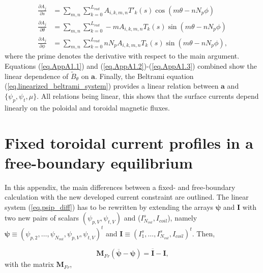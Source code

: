 \begin{align}
	\frac{\partial A_j}{\partial s} &= \sum_{m,n}\sum_{k=0}^{L_{rad}} A_{i,k,m,n}T'_k(s)\cos(m\theta-nN_p\phi) \label{eq.AppA1.2} \\
	\frac{\partial A_j}{\partial \theta} &= \sum_{m,n}\sum_{k=0}^{L_{rad}} -mA_{i,k,m,n}T_k(s)\sin(m\theta-nN_p\phi) \\
	\frac{\partial A_j}{\partial \phi} &= \sum_{m,n}\sum_{k=0}^{L_{rad}} nN_pA_{i,k,m,n}T_k(s)\sin(m\theta-nN_p\phi) , \label{eq.AppA1.3}
\end{align}
where the prime denotes the derivative with respect to the main argument. Equations (\ref{eq.AppA1.1}) and (\ref{eq.AppA1.2})-(\ref{eq.AppA1.3}) combined show the linear dependence of $\tilde{B}_\theta$ on $\mathbf{a}$. Finally, the Beltrami equation (\ref{eq.linearized_beltrami_system}) provides a linear relation between $\mathbf{a}$ and $\{\psi_p,\psi_t,\mu\}$. All relations being linear, this shows that the surface currents depend linearly on the poloidal and toroidal magnetic fluxes.

\chapter{Fixed toroidal current profiles in a free-boundary equilibrium}\label{appA}

In this appendix, the main differences between a fixed- and free-boundary calculation with the new developed current constraint are outlined. The linear system (\ref{eq.psip_diff}) has to be rewritten by extending the arrays $\bm{\psi}$ and $\mathbf{I}$ with two new pairs of scalars $(\psi_{p,V}, \psi_{t,V})$ and ($I^s_{N_{vol}}, I_{coil}$), namely $\bm{\psi}\equiv(\psi_{p,2},\ldots,\psi_{N_{vol}}, \psi_{p,V}, \psi_{t,V})^t$ and $\bm{I}\equiv(I^s_1,\ldots,I^s_{N_{vol}},I_{coil})^t$. Then,

\begin{equation}
	\mathbf{M}_{Fr} (\overbar{\bm{\psi}} - \bm{\psi}) = \overbar{\bm{I}} - \bm{I},
\end{equation}
with the matrix $\mathbf{M}_{Fr}$,

